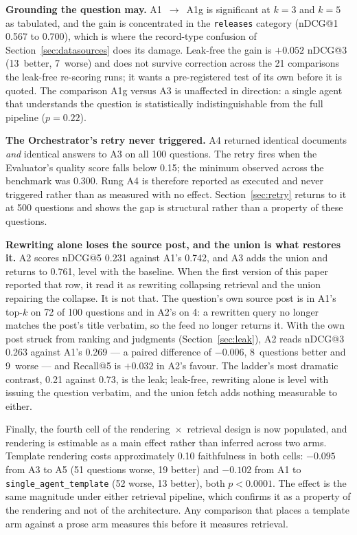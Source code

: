 \documentclass[acmsmall,review,anonymous,screen]{acmart}
\begin{document}
\textbf{Grounding the question may.} A1~$\to$~A1g is significant at $k=3$ and
$k=5$ as tabulated, and the gain is concentrated in the \texttt{releases}
category (nDCG@1 0.567 to 0.700), which is where the record-type confusion of
Section~\ref{sec:datasources} does its damage. Leak-free the gain is $+0.052$
nDCG@3 (13~better, 7~worse) and does not survive correction across the 21
comparisons the leak-free re-scoring runs; it wants a pre-registered test of its
own before it is quoted. The comparison A1g versus A3 is unaffected in
direction: a single agent that understands the question is statistically
indistinguishable from the full pipeline ($p=0.22$).

\textbf{The Orchestrator's retry never triggered.} A4 returned identical
documents \emph{and} identical answers to A3 on all 100 questions. The retry
fires when the Evaluator's quality score falls below 0.15; the minimum observed
across the benchmark was 0.300. Rung A4 is therefore reported as executed and
never triggered rather than as measured with no effect. Section~\ref{sec:retry}
returns to it at 500 questions and shows the gap is structural rather than a
property of these questions.

\textbf{Rewriting alone loses the source post, and the union is what
restores it.} A2 scores nDCG@5 0.231 against A1's 0.742, and A3 adds the union
and returns to 0.761, level with the baseline. When the first version of this
paper reported that row, it read it as rewriting collapsing retrieval and the
union repairing the collapse. It is not that. The question's own source post is
in A1's top-$k$ on 72 of 100 questions and in A2's on 4: a rewritten query no
longer matches the post's title verbatim, so the feed no longer returns it.
With the own post struck from ranking and judgments (Section~\ref{sec:leak}),
A2 reads nDCG@3 0.263 against A1's 0.269 --- a paired difference of $-0.006$,
8~questions better and 9~worse --- and Recall@5 is $+0.032$ in A2's favour. The
ladder's most dramatic contrast, 0.21 against 0.73, is the leak; leak-free,
rewriting alone is level with issuing the question verbatim, and the union fetch
adds nothing measurable to either.

Finally, the fourth cell of the rendering~$\times$~retrieval design is now
populated, and rendering is estimable as a main effect rather than inferred
across two arms. Template rendering costs approximately 0.10 faithfulness in
both cells: $-0.095$ from A3 to A5 (51 questions worse, 19 better) and $-0.102$
from A1 to \texttt{single\_agent\_template} (52 worse, 13 better), both
$p<0.0001$. The effect is the same magnitude under either retrieval pipeline,
which confirms it as a property of the rendering and not of the architecture.
Any comparison that places a template arm against a prose arm measures this
before it measures retrieval.
\end{document}
